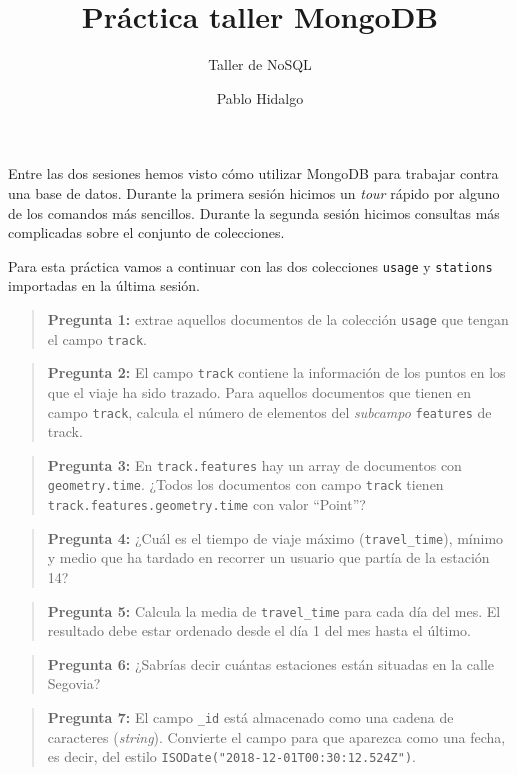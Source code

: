 \documentclass[]{article}
\title{Práctica taller MongoDB}
\subtitle{Taller de NoSQL}
\author{Pablo Hidalgo}
\date{}
\begin{document}
\maketitle

Entre las dos sesiones hemos visto cómo utilizar MongoDB para trabajar
contra una base de datos. Durante la primera sesión hicimos un
\emph{tour} rápido por alguno de los comandos más sencillos. Durante la
segunda sesión hicimos consultas más complicadas sobre el conjunto de
colecciones.

Para esta práctica vamos a continuar con las dos colecciones
\texttt{usage} y \texttt{stations} importadas en la última sesión.

\begin{quote}
\textbf{Pregunta 1:} extrae aquellos documentos de la colección
\texttt{usage} que tengan el campo \texttt{track}.
\end{quote}

\begin{quote}
\textbf{Pregunta 2:} El campo \texttt{track} contiene la información de
los puntos en los que el viaje ha sido trazado. Para aquellos documentos
que tienen en campo \texttt{track}, calcula el número de elementos del
\emph{subcampo} \texttt{features} de track.
\end{quote}

\begin{quote}
\textbf{Pregunta 3:} En \texttt{track.features} hay un array de
documentos con \texttt{geometry.time}. ¿Todos los documentos con campo
\texttt{track} tienen \texttt{track.features.geometry.time} con valor
``Point''?
\end{quote}

\begin{quote}
\textbf{Pregunta 4:} ¿Cuál es el tiempo de viaje máximo
(\texttt{travel\_time}), mínimo y medio que ha tardado en recorrer un
usuario que partía de la estación 14?
\end{quote}

\begin{quote}
\textbf{Pregunta 5:} Calcula la media de \texttt{travel\_time} para cada
día del mes. El resultado debe estar ordenado desde el día 1 del mes
hasta el último.
\end{quote}

\begin{quote}
\textbf{Pregunta 6:} ¿Sabrías decir cuántas estaciones están situadas en
la calle Segovia?
\end{quote}

\begin{quote}
\textbf{Pregunta 7:} El campo \texttt{\_id} está almacenado como una
cadena de caracteres (\emph{string}). Convierte el campo para que
aparezca como una fecha, es decir, del estilo
\texttt{ISODate("2018-12-01T00:30:12.524Z")}.
\end{quote}
\end{document}

